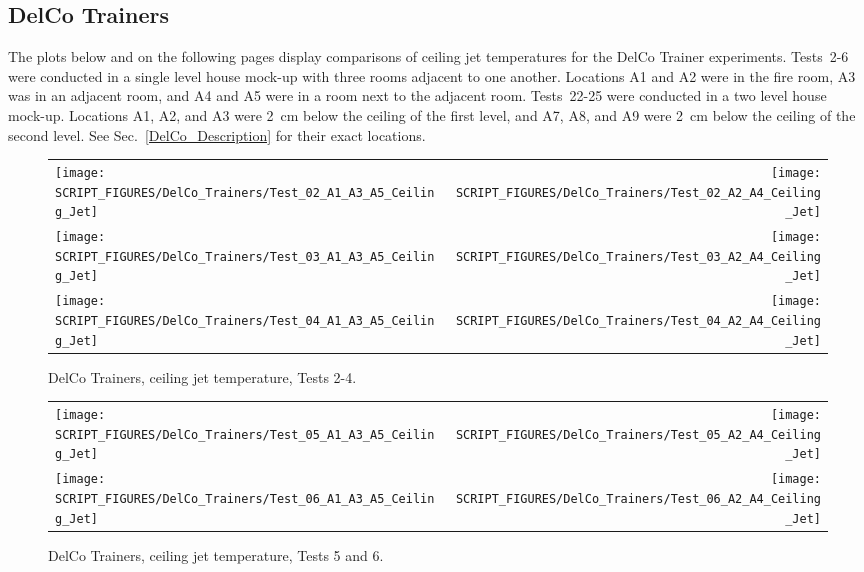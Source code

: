 \subsection{DelCo Trainers}

The plots below and on the following pages display comparisons of ceiling jet temperatures for the DelCo Trainer experiments. Tests~2-6 were conducted in a single level house mock-up with three rooms adjacent to one another. Locations A1 and A2 were in the fire room, A3 was in an adjacent room, and A4 and A5 were in a room next to the adjacent room. Tests~22-25 were conducted in a two level house mock-up. Locations A1, A2, and A3 were 2~cm below the ceiling of the first level, and A7, A8, and A9 were 2~cm below the ceiling of the second level. See Sec.~\ref{DelCo_Description} for their exact locations.

\begin{figure}[!h]
\begin{tabular*}{\textwidth}{l@{\extracolsep{\fill}}r}
\texttt{[image: SCRIPT\_FIGURES/DelCo\_Trainers/Test\_02\_A1\_A3\_A5\_Ceiling\_Jet]} &
\texttt{[image: SCRIPT\_FIGURES/DelCo\_Trainers/Test\_02\_A2\_A4\_Ceiling\_Jet]} \\
\texttt{[image: SCRIPT\_FIGURES/DelCo\_Trainers/Test\_03\_A1\_A3\_A5\_Ceiling\_Jet]} &
\texttt{[image: SCRIPT\_FIGURES/DelCo\_Trainers/Test\_03\_A2\_A4\_Ceiling\_Jet]} \\
\texttt{[image: SCRIPT\_FIGURES/DelCo\_Trainers/Test\_04\_A1\_A3\_A5\_Ceiling\_Jet]} &
\texttt{[image: SCRIPT\_FIGURES/DelCo\_Trainers/Test\_04\_A2\_A4\_Ceiling\_Jet]}
\end{tabular*}
\caption[DelCo Trainers, ceiling jet temperature, Tests 2-4]
{DelCo Trainers, ceiling jet temperature, Tests 2-4.}
\label{DelCo_Ceiling_Jet_1}
\end{figure}

\newpage

\begin{figure}[p]
\begin{tabular*}{\textwidth}{l@{\extracolsep{\fill}}r}
\texttt{[image: SCRIPT\_FIGURES/DelCo\_Trainers/Test\_05\_A1\_A3\_A5\_Ceiling\_Jet]} &
\texttt{[image: SCRIPT\_FIGURES/DelCo\_Trainers/Test\_05\_A2\_A4\_Ceiling\_Jet]} \\
\texttt{[image: SCRIPT\_FIGURES/DelCo\_Trainers/Test\_06\_A1\_A3\_A5\_Ceiling\_Jet]} &
\texttt{[image: SCRIPT\_FIGURES/DelCo\_Trainers/Test\_06\_A2\_A4\_Ceiling\_Jet]}
\end{tabular*}
\caption[DelCo Trainers, ceiling jet temperature, Tests 5 and 6]
{DelCo Trainers, ceiling jet temperature, Tests 5 and 6.}
\label{DelCo_Ceiling_Jet_2}
\end{figure}

